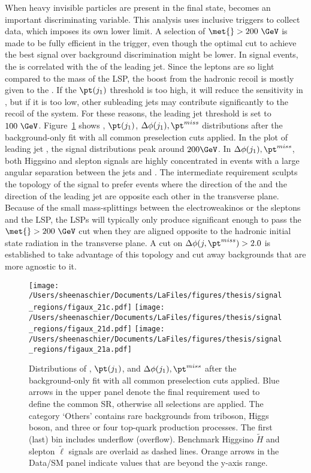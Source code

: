 When heavy invisible particles are present in the final state, \met{} becomes an important discriminating variable.  This analysis uses inclusive \met{} triggers to collect data, which imposes its own lower limit.  A selection of $\met{} >200~\GeV$ is made to be fully efficient in the \met{} trigger, even though the optimal cut to achieve the best signal over background discrimination might be lower.  In signal events, the \met is correlated with the \pt of the leading jet.  Since the leptons are so light compared to the mass of the LSP, the boost from the hadronic recoil is mostly given to the \met{}.  If the $\pt(j_1)$ threshold is too high, it will reduce the sensitivity in \met{}, but if it is too low, other subleading jets may contribute significantly to the recoil of the system.  For these reasons, the leading jet \pt threshold is set to $100~\GeV$.  Figure~\ref{fig:sr:cm2} shows \met, $\pt(j_1)$, $\Delta\phi(j_1), \pt^{miss}$ distributions after the background-only fit with all common preselection cuts applied.  In the plot of leading jet \pt, the signal distributions peak around $200\GeV$.  In $\Delta\phi(j_1), \pt^{miss}$, both Higgsino and slepton signals are highly concentrated in events with a large angular separation between the jets and \met.  The intermediate \met{} requirement sculpts the topology of the signal to prefer events where the direction of the \met and the direction of the leading jet are opposite each other in the transverse plane.  Because of the small mass-splittings between the electroweakinos or the sleptons and the LSP, the LSPs will typically only produce significant enough \met{} to pass the $\met{} > 200~\GeV$ cut when they are aligned opposite to the hadronic initial state radiation in the transverse plane.  A cut on $\Delta\phi(j, \pt^{miss}) > 2.0$ is established to take advantage of this topology and cut away backgrounds that are more agnostic to it.  
   \begin{figure}%
  \begin{center}
  \texttt{[image: /Users/sheenaschier/Documents/LaFiles/figures/thesis/signal\_regions/figaux\_21c.pdf]}
      \texttt{[image: /Users/sheenaschier/Documents/LaFiles/figures/thesis/signal\_regions/figaux\_21d.pdf]}
         \texttt{[image: /Users/sheenaschier/Documents/LaFiles/figures/thesis/signal\_regions/figaux\_21a.pdf]}
   \end{center}
 \caption{Distributions of \met{}, $\pt(j_1)$, and $\Delta\phi(j_1), \pt^{miss}$ after the background-only fit with all common preselection cuts applied.  Blue arrows in the upper panel denote the final requirement used to define the common SR, otherwise all selections are applied. The category `Others' contains rare backgrounds from triboson, Higgs boson, and three or four top-quark production processes. The first (last) bin includes underflow (overflow).  Benchmark Higgsino $\tilde H$ and slepton $\tilde\ell$ signals are overlaid as dashed lines. Orange arrows in the Data/SM panel indicate values that are beyond the y-axis range.}
 \label{fig:sr:cm2}
 \end{figure}
 
